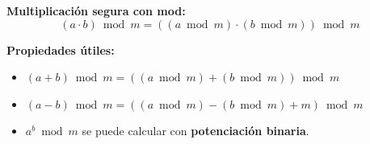 \textbf{Multiplicación segura con mod:}
\[
(a \cdot b) \bmod m = \left( (a \bmod m) \cdot (b \bmod m) \right) \bmod m
\]

\textbf{Propiedades útiles:}
\begin{itemize}
  \item \( (a + b) \bmod m = ((a \bmod m) + (b \bmod m)) \bmod m \)
  \item \( (a - b) \bmod m = ((a \bmod m) - (b \bmod m) + m) \bmod m \)
  \item \( a^b \bmod m \) se puede calcular con \textbf{potenciación binaria}.
\end{itemize}
